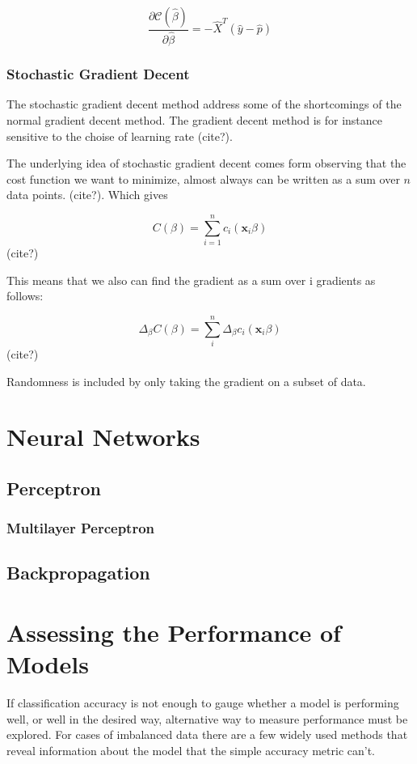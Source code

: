 \begin{equation}\label{eq:delta-c}
	\frac{\partial \mathcal{C}(\hat{\beta})}{\partial \hat{\beta}} = -\hat{X}^T\left(\hat{y}-\hat{p}\right)
\end{equation}

\subsubsection{Stochastic Gradient Decent}
The stochastic gradient decent method address some of the shortcomings
of the normal gradient decent method. The gradient decent method is
for instance sensitive to the choise of learning rate (cite?).

The underlying idea of stochastic gradient decent comes form observing
that the cost function we want to minimize, almost always can be written as
a sum over \(n\) data points. (cite?). Which gives

\begin{equation}
	C(\beta) = \sum\limits_{i=1}^n c_i (\mathbf{x}_i\beta)
\end{equation} (cite?)

This means that we also can find the gradient as a sum over i gradients
as follows:

\begin{equation}
	\Delta_{\beta} C(\beta) = \sum\limits_{i}^n \Delta_{\beta}c_i (\mathbf{x}_i\beta)
\end{equation} (cite?)

Randomness is included by only taking the gradient on a subset of data.

\section{Neural Networks}
\subsection{Perceptron}

\subsubsection{Multilayer Perceptron}

\subsection{Backpropagation}

\section{Assessing the Performance of Models}
If classification accuracy is not enough to gauge whether a model is
performing well, or well in the desired way, alternative way to measure
performance must be explored. For cases of imbalanced data there are a few
widely used methods that reveal information about the model that the simple
accuracy metric can't.

